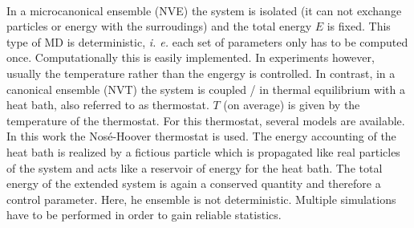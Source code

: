 \documentclass[11pt,DIV=13,BCOR=5mm,a4paper,headinclude]{scrbook}
\begin{document}
\\
In a microcanonical ensemble (NVE) the system is isolated (it can not exchange particles or energy with the surroudings) and the total energy $E$ is fixed.
This type of MD is deterministic, \textit{i. e.} each set of parameters only has to be computed once.
Computationally this is easily implemented.
In experiments however, usually the temperature rather than the engergy is controlled.
In contrast, in a canonical ensemble (NVT) the system is coupled / in thermal equilibrium with a heat bath, also referred to as thermostat.
$T$ (on average) is given by the temperature of the thermostat.
For this thermostat, several models are available.
In this work the Nos\'{e}-Hoover thermostat\cite{nose1984,nose1984_2,hoover1985} is used.
The energy accounting of the heat bath is realized by a fictious particle which is propagated like real particles of the system and acts like a reservoir of energy for the heat bath.
The total energy of the extended system is again a conserved quantity and therefore a control parameter.
Here, he ensemble is not deterministic.
Multiple simulations have to be performed in order to gain reliable statistics.
\end{document}
